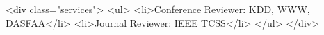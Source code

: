 <div class="services">
    <ul>
        <li>Conference Reviewer: KDD, WWW, DASFAA</li>
        <li>Journal Reviewer: IEEE TCSS</li>
    </ul>
</div>